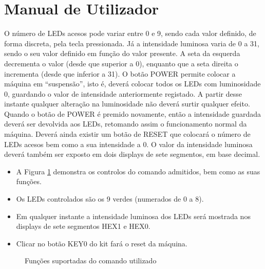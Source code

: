\documentclass[a4paper,11pt,openright,oneside]{report}
\begin{document}
\section{Manual de Utilizador}
\label{sec:Manual}

O número de LEDs acesos pode variar entre 0 e 9, sendo cada valor definido, de forma discreta, pela tecla pressionada. Já a intensidade luminosa varia de 0 a 31, sendo o seu valor definido em função do valor presente. A seta da esquerda decrementa o valor (desde que superior a 0), enquanto que a seta direita o incrementa (desde que inferior a 31). O botão POWER permite colocar a máquina em ``suspensão'', isto é, deverá colocar todos os LEDs com luminosidade 0, guardando o valor de intensidade anteriormente registado. A partir desse instante qualquer alteração na luminosidade não deverá surtir qualquer efeito. Quando o botão de POWER é premido novamente, então a intensidade guardada deverá ser devolvida aos LEDs, retomando assim o funcionamento normal da máquina. Deverá ainda existir um botão de RESET que colocará o número de LEDs acesos bem como a sua intensidade a 0. O valor da intensidade luminosa deverá também ser exposto em dois displays de sete segmentos, em base decimal.

\begin{itemize}
\item A Figura \ref{fig:ir_leds0} demonstra os controlos do comando admitidos, bem como as suas funções.
\item Os LEDs controlados são os 9 verdes (numerados de 0 a 8).
\item Em qualquer instante a intensidade luminosa dos LEDs será mostrada nos displays de sete segmentos HEX1 e HEX0.
\item Clicar no botão KEY0 do kit fará o reset da máquina.
\end{itemize}

\begin{figure}[ht]
\center
{}
\caption{Funções suportadas do comando utilizado}
\label{fig:ir_leds0}
\end{figure}

\maketitle
\nocite{*}
\end{document}
